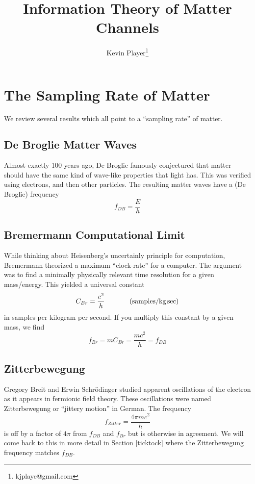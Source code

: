 \documentclass[12pt,a4paper]{article}
\begin{document}
\title{Information Theory of Matter Channels}
\author[1]{Kevin Player\footnote{kjplaye@gmail.com}}

\maketitle


\section{The Sampling Rate of Matter}
\label{rate}
We review several results which all point to a ``sampling rate'' of matter.
\subsection{De Broglie Matter Waves}
Almost exactly 100 years ago, De Broglie famously conjectured that matter should have the same kind of wave-like properties that light has.  This was verified using electrons, and then other particles.  The resulting matter waves have a (De Broglie) frequency
\[
  f_{DB} = \frac{E}{h}
\]

\subsection{Bremermann Computational Limit}
While thinking about Heisenberg's uncertainly principle for computation, Bremermann theorized a maximum ``clock-rate'' for a computer.  The argument was to find a minimally physically relevant time resolution for a given mass/energy.  This yielded a universal constant
\[
  C_{Br} = \frac{c^2}{h} \hspace{0.5 in} (\si[per-mode=symbol]{samples\per\kilogram.\sec})
\]
in samples per kilogram per second.  If you multiply this constant by a given mass, we find
\[
 f_{Br} = m C_{Br} = \frac{mc^2}{h} = f_{DB}
\]

\subsection{Zitterbewegung}
Gregory Breit and Erwin Schrödinger studied apparent oscillations of the electron as it appears in fermionic field theory.  These oscillations were named Zitterbewegung or ``jittery motion'' in German.  The frequency 
\[
 f_{Zitter} = \frac{4 \pi mc^2}{h}
 \]
is off by a factor of $4 \pi$ from $f_{DB}$ and $f_{Br}$ but is otherwise in agreement.  We will come back to this in more detail in Section \ref{ticktock} where the Zitterbewegung frequency matches $f_{DB}$.
\end{document}
